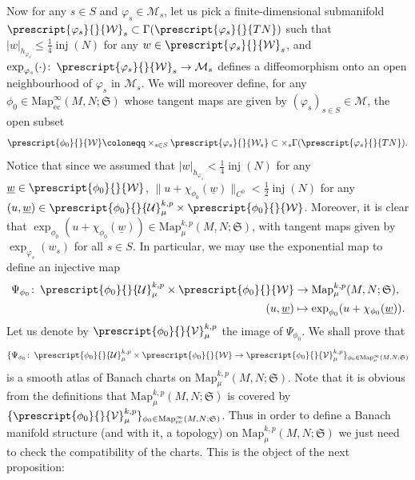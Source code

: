 \documentclass{article}
\numberwithin{equation}{section}        %
\theoremstyle{bfnote}
\theoremstyle{definition}
\theoremstyle{bfremark}
\newcommand{\col}{\colon \thinspace}        %
\newcommand{\Map}{\mathrm{Map}}             %
\DeclareMathOperator{\inj}{inj}                 %
\begin{document}
Now for any $s \in S$ and $\varphi_s \in \mathcal{M}_s$, let us pick a finite-dimensional submanifold $\prescript{\varphi_s}{}{\mathcal{W}}_s \subset \Gamma(\prescript{\varphi_s}{}{TN})$ such that $|w|_{h_{\varphi_s}} \leq \frac{1}{4}\inj(N)$ for any $w \in \prescript{\varphi_s}{}{\mathcal{W}}_s$, and $\exp_{\varphi_s}(\cdot) \col \prescript{\varphi_s}{}{\mathcal{W}}_s \to \mathcal{M}_s$ defines a diffeomorphism onto an open neighbourhood of $\varphi_s$ in $\mathcal{M}_s$. We will moreover define, for any $\phi_0 \in \Map^\infty_{\mathrm{ec}}(M,N;\mathfrak{S})$ whose tangent maps are given by $(\varphi_s)_{s \in S} \in \mathcal{M}$, the open subset
\begin{equation}
    \prescript{\phi_0}{}{\mathcal{W}} \coloneqq \times_{s \in S} \prescript{\varphi_{s}}{}{\mathcal{W}_s} \subset \times_s \Gamma(\prescript{\varphi_s}{}{TN}) .
\end{equation}
Notice that since we assumed that $|w|_{h_{\varphi_{s}}} < \tfrac{1}{4}\inj(N)$ for any $\underline{w} \in \prescript{\phi_0}{}{\mathcal{W}}$, $ \|u + \chi_{\phi_0}(\underline{w}) \|_{C^0} < \tfrac{1}{2}\inj(N)$ for any $(u,\underline{w}) \in \prescript{\phi_0}{}{\mathcal{U}}^{k,p}_\mu \times \prescript{\phi_0}{}{\mathcal{W}}$. Moreover, it is clear that $\exp_{\phi_0}(u+\chi_{\phi_0}(\underline{w})) \in \Map^{k,p}_\mu(M,N;\mathfrak{S})$, with tangent maps given by $\exp_{\varphi_s}(w_s)$ for all $s \in S$. In particular, we may use the exponential map to define an injective map
\begin{equation}
    \begin{aligned}
        \Psi_{\phi_0} \col \prescript{\phi_0}{}{\mathcal{U}}^{k,p}_\mu \times \prescript{\phi_0}{}{\mathcal{W}} & \to \Map^{k,p}_\mu(M,N;\mathfrak{S}), \\
        (u,\underline{w}) & \mapsto \exp_{\phi_0}(u+\chi_{\phi_0}(\underline{w})) .
    \end{aligned}
\end{equation}
Let us denote by $\prescript{\phi_0}{}{\mathcal{V}}^{k,p}_\mu$ the image of $\Psi_{\phi_0}$. We shall prove that 
\begin{equation*}
    \{\Psi_{\phi_0} \col \prescript{\phi_0}{}{\mathcal{U}}^{k,p}_\mu \times \prescript{\phi_0}{}{\mathcal{W}} \to \prescript{\phi_0}{}{\mathcal{V}}^{k,p}_\mu\}_{\phi_0 \in \Map^\infty_\mu(M,N;\mathfrak{S})}
\end{equation*}
is a smooth atlas of Banach charts on $\Map^{k,p}_\mu(M,N;\mathfrak{S})$. Note that it is obvious from the definitions that $\Map^{k,p}_\mu(M,N;\mathfrak{S})$ is covered by $\{\prescript{\phi_0}{}{\mathcal{V}}^{k,p}_\mu\}_{\phi_0 \in \Map^\infty_{\mathrm{ec}}(M,N;\mathfrak{S})}$. Thus in order to define a Banach manifold structure (and with it, a topology) on $\Map^{k,p}_\mu(M,N;\mathfrak{S})$ we just need to check the compatibility of the charts. This is the object of the next proposition:
\end{document}
